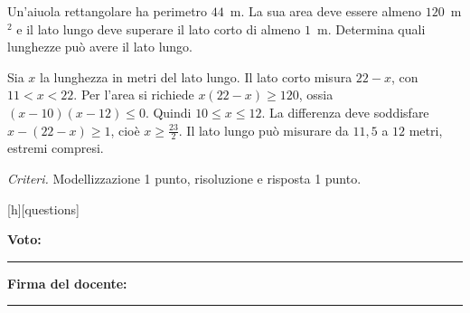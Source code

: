 \documentclass[11pt,a4paper,addpoints]{exam}
\makeatletter
\newcommand{\fila}{A}
\newcounter{offsetfila}
\newcounter{totalqfila}
\newenvironment{esercizi}
  {%
    \begin{questions}
    \setcounter{question}{\value{offsetfila}}%
  }
  {\end{questions}}
\newenvironment{esercizio}
  {%
    \par
    \ifprintanswers\else\begin{samepage}\fi
  }
  {%
    \ifprintanswers\else\end{samepage}\fi
    \par\vspace{3pt}
  }
\newcommand{\finefila}{%
  \setcounter{totalqfila}{\value{question}}%
  \endgradingrange{fila\fila}%
  \ifprintanswers
  \else
    \vfill
    \begin{center}
      \small
      \partialgradetable{fila\fila}[h][questions]
    \end{center}
    \vspace{6pt}
    \noindent
    {\small
      \textbf{Voto:}\ \rule{3cm}{0.4pt}
      \hfill
      \textbf{Firma del docente:}\ \rule{5cm}{0.4pt}
    }%
  \fi
  \label{fine@fila@\fila}%
}
\makeatother
\begin{document}
\begin{esercizi}
\begin{esercizio}
Un'aiuola rettangolare ha perimetro $44$~m. La sua area deve essere almeno
$120$~m$^2$ e il lato lungo deve superare il lato corto di almeno $1$~m.
Determina quali lunghezze può avere il lato lungo.
\begin{solution}
Sia $x$ la lunghezza in metri del lato lungo. Il lato corto misura $22-x$,
con $11<x<22$. Per l'area si richiede $x(22-x)\ge120$, ossia
$(x-10)(x-12)\le0$. Quindi $10\le x\le12$.
La differenza deve soddisfare $x-(22-x)\ge1$, cioè $x\ge\frac{23}{2}$.
Il lato lungo può misurare da $11{,}5$ a $12$ metri, estremi compresi.
\par\textit{Criteri.} Modellizzazione 1 punto, risoluzione e risposta 1 punto.
\end{solution}
\end{esercizio}
\end{esercizi}
\finefila
\end{document}
